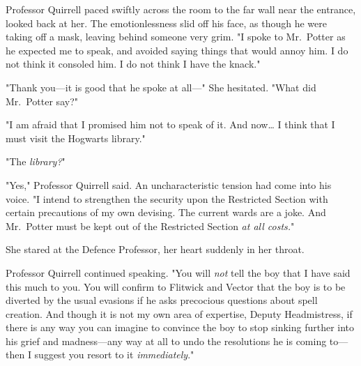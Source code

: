 Professor Quirrell paced swiftly across the room to the far wall near the
entrance, looked back at her. The emotionlessness slid off his face, as though
he were taking off a mask, leaving behind someone very grim. "I spoke to
Mr.~Potter as he expected me to speak, and avoided saying things that would
annoy him. I do not think it consoled him. I do not think I have the knack."

"Thank you---it is good that he spoke at all---" She hesitated. "What did
Mr.~Potter say?"

"I am afraid that I promised him not to speak of it. And now{\ldots} I think
that I must visit the Hogwarts library."

"The \emph{library?}"

"Yes," Professor Quirrell said. An uncharacteristic tension had come into his
voice. "I intend to strengthen the security upon the Restricted Section with
certain precautions of my own devising. The current wards are a joke. And
Mr.~Potter must be kept out of the Restricted Section \emph{at all costs.}"

She stared at the Defence Professor, her heart suddenly in her throat.

Professor Quirrell continued speaking. "You will \emph{not} tell the boy that I
have said this much to you. You will confirm to Flitwick and Vector that the
boy is to be diverted by the usual evasions if he asks precocious questions
about spell creation. And though it is not my own area of expertise, Deputy
Headmistress, if there is any way you can imagine to convince the boy to stop
sinking further into his grief and madness---any way at all to undo the
resolutions he is coming to---then I suggest you resort to it
\emph{immediately}."

